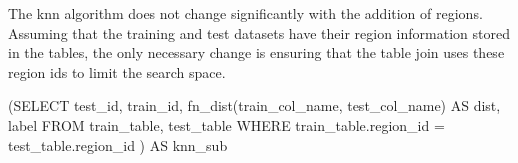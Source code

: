 The knn algorithm does not change significantly with the addition of regions.
Assuming that the training and test datasets have their region information
stored in the tables, the only necessary change is ensuring that the table
join uses these region ids to limit the search space.


\begin{sql}
	(SELECT test_id,
            train_id,
            fn_dist(train_col_name, test_col_name) AS dist,
            label
    FROM train_table, test_table
    WHERE train_table.region_id = test_table.region_id
    ) AS knn_sub
\end{sql}
